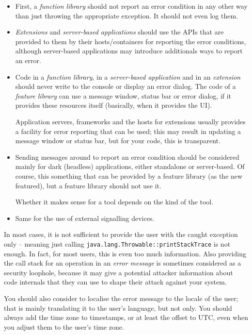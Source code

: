 \documentclass[11pt,a4paper, titlepage, parskip=half, headsepline, footsepline, cleardoublepage=current, headheight=1cm]{scrbook}
\begin{document}
\begin{itemize}
\item{First, a \textit{function library} should not report an error condition in any other way than just throwing the appropriate exception. It should not even log them.}

\item{\textit{Extensions} and \textit{server-based applications} should use the APIs that are provided to them by their hosts/containers for reporting the error conditions, although server-based applications may introduce additionals ways to report an error.}

\item{Code in a \textit{function library}, in a \textit{server-based application} and in an \textit{extension} should never write to the console or display an error dialog. The code of a \textit{feature library} can use a message window, status bar or error dialog, if it provides these resources itself (basically, when it provides the UI).

Application servers, frameworks and the hosts for extensions usually provides a facility for error reporting that can be used; this may result in updating a message window or status bar, but for your code, this is transparent.}

\item{Sending messages around to report an error condition should be considered mainly for dark (headless) applications, either standalone or server-based. Of course, this something that can be provided by a feature library (as the new featured), but a feature library should not use it.

Whether it makes sense for a tool depends on the kind of the tool.}

\item{Same for the use of external signalling devices.}
\end{itemize}

In most cases, it is not sufficient to provide the user with the caught exception only – meaning just calling \lstinline|java.lang.Throwable::printStackTrace| is not enough. In fact, for most users, this is even too much information. Also providing the call stack for an operation in an \textit{error message} is sometimes considered as a security loophole, because it may give a potential attacker information about code internals that they can use to shape their attack against your system.

You should also consider to localise the error message to the locale of the user; that is mainly translating it to the user's language, but not only. You should always add the time zone to timestamps, or at least the offset to UTC, even when you adjust them to the user's time zone.
\end{document}
